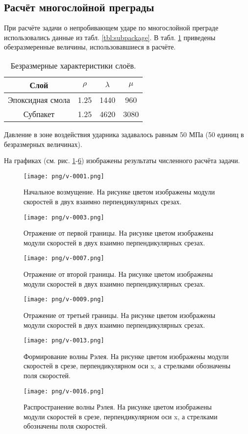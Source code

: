 \subsection{Расчёт многослойной преграды}
При расчёте задачи о непробивающем ударе по многослойной преграде использовались
данные из табл. \ref{tbl:subpackage}. В табл. \ref{tbl:subpackage_2} приведены
обезразмеренные величины, использовавшиеся в расчёте.
\begin{table}[h]
\centering
\begin{tabular}{|c|c|c|c|}
\hline
Слой & $\rho$ & $\lambda$ & $\mu$  \\
\hline
Эпоксидная смола & 1.25 & 1440 & 960 \\
Субпакет & 1.25 & 4620 & 3080 \\
\hline
\end{tabular}
\caption{Безразмерные характеристики слоёв.}
\label{tbl:subpackage_2}
\end{table}

Давление в зоне воздействия ударника задавалось равным 50 МПа (50 единиц в безразмерных величинах).

На графиках (см. рис. \ref{pic:multilayer_init}-\ref{pic:multilayer_Rayleigh_2}) изображены результаты численного расчёта задачи.
\begin{figure}[htp]
\centering
\texttt{[image: png/v-0001.png]}
\caption{Начальное возмущение. На рисунке цветом изображены модули скоростей в
двух взаимно перпендикулярных срезах.}
\label{pic:multilayer_init}
\end{figure}
\begin{figure}[htp]
\centering
\texttt{[image: png/v-0003.png]}
\caption{Отражение от первой границы. На рисунке цветом изображены модули скоростей в
двух взаимно перпендикулярных срезах.}
\label{pic:multilayer_b1}
\end{figure}
\begin{figure}[htp]
\centering
\texttt{[image: png/v-0007.png]}
\caption{Отражение от второй границы. На рисунке цветом изображены модули скоростей в
двух взаимно перпендикулярных срезах.}
\label{pic:multilayer_b2}
\end{figure}
\begin{figure}[htp]
\centering
\texttt{[image: png/v-0009.png]}
\caption{Отражение от третьей границы. На рисунке цветом изображены модули скоростей в
двух взаимно перпендикулярных срезах.}
\label{pic:multilayer_b3}
\end{figure}
\begin{figure}[htp]
\centering
\texttt{[image: png/v-0013.png]}
\caption{Формирование волны Рэлея. На рисунке цветом изображены модули скоростей
в срезе, перпендикулярном оси x, а стрелками обозначены поля скоростей.}
\label{pic:multilayer_b3}
\end{figure}
\begin{figure}[htp]
\centering
\texttt{[image: png/v-0016.png]}
\caption{Распространение волны Рэлея. На рисунке цветом изображены модули скоростей
в срезе, перпендикулярном оси x, а стрелками обозначены поля скоростей.}
\label{pic:multilayer_Rayleigh_2}
\end{figure}
